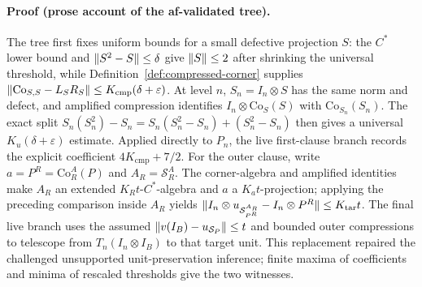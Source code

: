 \paragraph{Proof (prose account of the af-validated tree).}
The tree first fixes uniform bounds for a small defective projection $S$: the
$C^*$ lower bound and $\lVert S^2-S\rVert\le\delta$ give $\lVert S\rVert\le2$ after shrinking
the universal threshold, while Definition~\ref{def:compressed-corner} supplies
$\lVert \mathrm{Co}_{S,S}-L_SR_S\rVert\le K_{\mathrm{cmp}}(\delta+\varepsilon)$.
At level $n$, $S_n=I_n\otimes S$ has the same norm and defect, and amplified
compression identifies $I_n\otimes\mathrm{Co}_S(S)$ with $\mathrm{Co}_{S_n}(S_n)$.
The exact split $S_n(S_n^2)-S_n=S_n(S_n^2-S_n)+(S_n^2-S_n)$ then gives a
universal $K_u(\delta+\varepsilon)$ estimate.  Applied directly to $P_n$, the
live first-clause branch records the explicit coefficient $4K_{\mathrm{cmp}}+7/2$.
For the outer clause, write $a=P^R=\mathrm{Co}^{A}_{R}(P)$ and $A_R=\mathcal S_R^A$.
The corner-algebra and amplified identities make $A_R$ an extended $K_Rt$-$C^*$-algebra
and $a$ a $K_at$-projection; applying the preceding comparison inside $A_R$ yields
$\lVert I_n\otimes u_{\mathcal S^{A_R}_{P^R}}-I_n\otimes P^R\rVert\le K_{\mathrm{tar}}t$.
The final live branch uses the assumed $\lVert v(I_B)-u_{\mathcal S_P}\rVert\le t$ and bounded
outer compressions to telescope from $T_n(I_n\otimes I_B)$ to that target unit.
This replacement repaired the challenged unsupported unit-preservation inference;
finite maxima of coefficients and minima of rescaled thresholds give the two witnesses.

